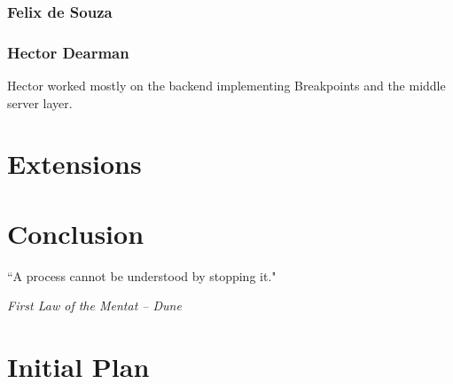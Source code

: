 \documentclass[11pt, a4paper]{article}
\newlength\longest
\begin{document}
\subsubsection{Felix de Souza}
\subsubsection{Hector Dearman}
Hector worked mostly on the backend implementing Breakpoints and the middle server layer. 

\section{Extensions}

\section{Conclusion}


\clearpage
\thispagestyle{empty}
\null\vfill
\begin{center}
\settowidth{}
\parbox{\longest}{%
  \raggedright{%
  ``A process cannot be understood by stopping it." \\
  }   
  \raggedright{\emph{First Law of the Mentat -- Dune}}\par%
}
\end{center}
\vfill\vfill
\clearpage

\appendix
\section{Initial Plan}
\label{sec:initialplan}

\end{document}
